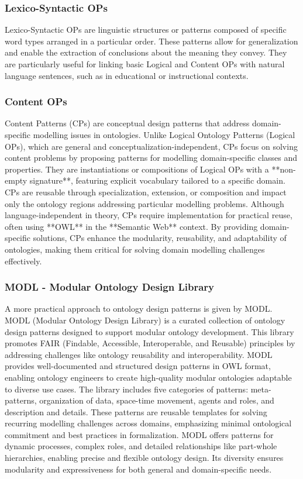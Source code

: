 \subsubsection{Lexico-Syntactic OPs}
Lexico-Syntactic OPs are linguistic structures or patterns composed of specific word types arranged in a particular order. These patterns allow for generalization and enable the extraction of conclusions about the meaning they convey. They are particularly useful for linking basic Logical and Content OPs with natural language sentences, such as in educational or instructional contexts.

\subsubsection{Content OPs}
Content Patterns (CPs) are conceptual design patterns that address domain-specific modelling issues in ontologies. Unlike Logical Ontology Patterns (Logical OPs), which are general and conceptualization-independent, CPs focus on solving content problems by proposing patterns for modelling domain-specific classes and properties. They are instantiations or compositions of Logical OPs with a **non-empty signature**, featuring explicit vocabulary tailored to a specific domain. CPs are reusable through specialization, extension, or composition and impact only the ontology regions addressing particular modelling problems. Although language-independent in theory, CPs require implementation for practical reuse, often using **OWL** in the **Semantic Web** context. By providing domain-specific solutions, CPs enhance the modularity, reusability, and adaptability of ontologies, making them critical for solving domain modelling challenges effectively.

\subsubsection{MODL - Modular Ontology Design Library}
A more practical approach to ontology design patterns is given by MODL. MODL (Modular Ontology Design Library) \cite{shimizu2019modl} is a curated collection of ontology design patterns designed to support modular ontology development. This library promotes FAIR (Findable, Accessible, Interoperable, and Reusable) principles by addressing challenges like ontology reusability and interoperability. MODL provides well-documented and structured design patterns in OWL format, enabling ontology engineers to create high-quality modular ontologies adaptable to diverse use cases. The library includes five categories of patterns: meta-patterns, organization of data, space-time movement, agents and roles, and description and details. These patterns are reusable templates for solving recurring modelling challenges across domains, emphasizing minimal ontological commitment and best practices in formalization. MODL offers patterns for dynamic processes, complex roles, and detailed relationships like part-whole hierarchies, enabling precise and flexible ontology design. Its diversity ensures modularity and expressiveness for both general and domain-specific needs.


